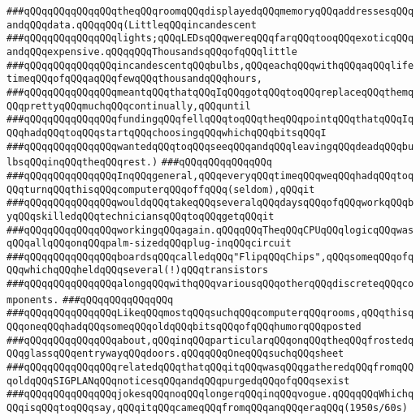 \verb|###qQQqqQQqqQQqqQQqtheqQQqroomqQQqdisplayedqQQqmemoryqQQqaddressesqQQqandqQQqdata.qQQqqQQq(LittleqQQqincandescent|\newline
\verb|###qQQqqQQqqQQqqQQqlights;qQQqLEDsqQQqwereqQQqfarqQQqtooqQQqexoticqQQqandqQQqexpensive.qQQqqQQqThousandsqQQqofqQQqlittle|\newline
\verb|###qQQqqQQqqQQqqQQqincandescentqQQqbulbs,qQQqeachqQQqwithqQQqaqQQqlifetimeqQQqofqQQqaqQQqfewqQQqthousandqQQqhours,|\newline
\verb|###qQQqqQQqqQQqqQQqmeantqQQqthatqQQqIqQQqgotqQQqtoqQQqreplaceqQQqthemqQQqprettyqQQqmuchqQQqcontinually,qQQquntil|\newline
\verb|###qQQqqQQqqQQqqQQqfundingqQQqfellqQQqtoqQQqtheqQQqpointqQQqthatqQQqIqQQqhadqQQqtoqQQqstartqQQqchoosingqQQqwhichqQQqbitsqQQqI|\newline
\verb|###qQQqqQQqqQQqqQQqwantedqQQqtoqQQqseeqQQqandqQQqleavingqQQqdeadqQQqbulbsqQQqinqQQqtheqQQqrest.)|\newline
\verb|###qQQqqQQqqQQqqQQq|\newline
\verb|###qQQqqQQqqQQqqQQqInqQQqgeneral,qQQqeveryqQQqtimeqQQqweqQQqhadqQQqtoqQQqturnqQQqthisqQQqcomputerqQQqoffqQQq(seldom),qQQqit|\newline
\verb|###qQQqqQQqqQQqqQQqwouldqQQqtakeqQQqseveralqQQqdaysqQQqofqQQqworkqQQqbyqQQqskilledqQQqtechniciansqQQqtoqQQqgetqQQqit|\newline
\verb|###qQQqqQQqqQQqqQQqworkingqQQqagain.qQQqqQQqTheqQQqCPUqQQqlogicqQQqwasqQQqallqQQqonqQQqpalm-sizedqQQqplug-inqQQqcircuit|\newline
\verb|###qQQqqQQqqQQqqQQqboardsqQQqcalledqQQq"FlipqQQqChips",qQQqsomeqQQqofqQQqwhichqQQqheldqQQqseveral(!)qQQqtransistors|\newline
\verb|###qQQqqQQqqQQqqQQqalongqQQqwithqQQqvariousqQQqotherqQQqdiscreteqQQqcomponents.|\newline
\verb|###qQQqqQQqqQQqqQQq|\newline
\verb|###qQQqqQQqqQQqqQQqLikeqQQqmostqQQqsuchqQQqcomputerqQQqrooms,qQQqthisqQQqoneqQQqhadqQQqsomeqQQqoldqQQqbitsqQQqofqQQqhumorqQQqposted|\newline
\verb|###qQQqqQQqqQQqqQQqabout,qQQqinqQQqparticularqQQqonqQQqtheqQQqfrostedqQQqglassqQQqentrywayqQQqdoors.qQQqqQQqOneqQQqsuchqQQqsheet|\newline
\verb|###qQQqqQQqqQQqqQQqrelatedqQQqthatqQQqitqQQqwasqQQqgatheredqQQqfromqQQqoldqQQqSIGPLANqQQqnoticesqQQqandqQQqpurgedqQQqofqQQqsexist|\newline
\verb|###qQQqqQQqqQQqqQQqjokesqQQqnoqQQqlongerqQQqinqQQqvogue.qQQqqQQqWhichqQQqisqQQqtoqQQqsay,qQQqitqQQqcameqQQqfromqQQqanqQQqeraqQQq(1950s/60s)|\newline
